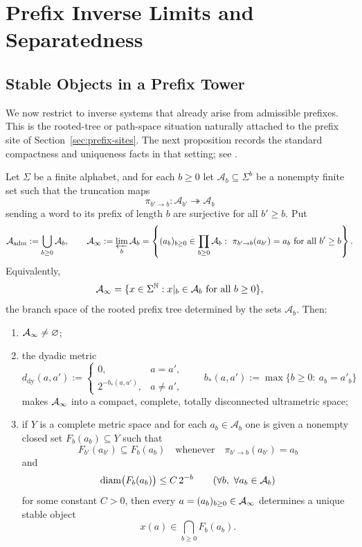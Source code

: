 \section{Prefix Inverse Limits and Separatedness}
\label{sec:inverse-limits}

\subsection{Stable Objects in a Prefix Tower}

We now restrict to inverse systems that already arise from admissible prefixes.
This is the rooted-tree or path-space situation naturally attached to the
prefix site of Section~\ref{sec:prefix-sites}.  The next proposition records
the standard compactness and uniqueness facts in that setting; see
\cite{RibesZalesskii2010ProfiniteGroups,
Wilson1998ProfiniteGroups,Munkres2000Topology,Bourbaki1989GeneralTopology}.

\begin{proposition}
\label{thm:recursive-addressing-dyadic-inverse-limit-stable-object}
Let $\Sigma$ be a finite alphabet, and for each $b\ge 0$ let
$\mathcal{A}_b\subseteq \Sigma^b$ be a nonempty finite set such that the
truncation maps
\[
\pi_{b'\to b}\colon \mathcal{A}_{b'}\twoheadrightarrow \mathcal{A}_b
\]
sending a word to its prefix of length $b$ are surjective for all $b'\ge b$.
Put
\[
\mathcal{A}_{\mathrm{adm}}:=\bigcup_{b\ge 0}\mathcal{A}_b,
\qquad
\mathcal{A}_{\infty}
:=
\varprojlim_b \mathcal{A}_b
=
\left\{
(a_b)_{b\ge 0}\in \prod_{b\ge 0}\mathcal{A}_b:\
\pi_{b'\to b}(a_{b'})=a_b\ \text{for all }b'\ge b
\right\}.
\]
Equivalently,
\[
\mathcal{A}_{\infty}
=
\{x\in \Sigma^{\mathbb{N}}: x|_b\in \mathcal{A}_b\ \text{for all }b\ge 0\},
\]
the branch space of the rooted prefix tree determined by the sets
$\mathcal{A}_b$.
Then:
\begin{enumerate}[label=\textup{(\arabic*)}]
\item $\mathcal{A}_{\infty}\neq\varnothing$;
\item the dyadic metric
\[
d_{\mathrm{dy}}(a,a')
:=
\begin{cases}
0,& a=a',\\[1mm]
2^{-b_\ast(a,a')},& a\neq a',
\end{cases}
\qquad
b_\ast(a,a')
:=
\max\{b\ge 0:\ a_b=a'_b\}
\]
makes $\mathcal{A}_{\infty}$ into a compact, complete, totally disconnected ultrametric
space;
\item if $Y$ is a complete metric space and for each $a_b\in \mathcal{A}_b$ one
is given a nonempty closed set $F_b(a_b)\subseteq Y$ such that
\[
F_{b'}(a_{b'})\subseteq F_b(a_b)
\quad\text{whenever}\quad
\pi_{b'\to b}(a_{b'})=a_b
\]
and
\[
\operatorname{diam}\bigl(F_b(a_b)\bigr)\le C\,2^{-b}
\qquad
(\forall b,\ \forall a_b\in\mathcal{A}_b)
\]
for some constant $C>0$, then every $a=(a_b)_{b\ge 0}\in \mathcal{A}_{\infty}$ determines a
unique stable object
\[
x(a)\in \bigcap_{b\ge 0} F_b(a_b).
\]
\end{enumerate}
\end{proposition}

